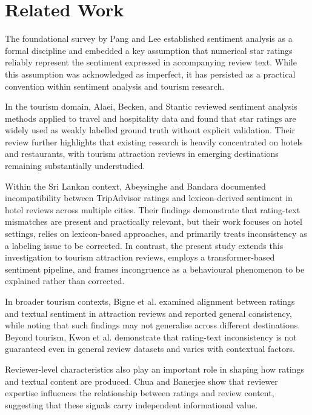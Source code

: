 \documentclass[conference]{IEEEtran}
\begin{document}
\section{Related Work}
The foundational survey by Pang and Lee \cite{pang2008opinion} established sentiment analysis as a formal discipline and embedded a key assumption that numerical star ratings reliably represent the sentiment expressed in accompanying review text. While this assumption was acknowledged as imperfect, it has persisted as a practical convention within sentiment analysis and tourism research.

In the tourism domain, Alaei, Becken, and Stantic \cite{alaei2019tourism} reviewed sentiment analysis methods applied to travel and hospitality data and found that star ratings are widely used as weakly labelled ground truth without explicit validation. Their review further highlights that existing research is heavily concentrated on hotels and restaurants, with tourism attraction reviews in emerging destinations remaining substantially understudied.

Within the Sri Lankan context, Abeysinghe and Bandara \cite{abeysinghe2022selflearning,abeysinghe2021anuradhapura} documented incompatibility between TripAdvisor ratings and lexicon-derived sentiment in hotel reviews across multiple cities. Their findings demonstrate that rating-text mismatches are present and practically relevant, but their work focuses on hotel settings, relies on lexicon-based approaches, and primarily treats inconsistency as a labeling issue to be corrected. In contrast, the present study extends this investigation to tourism attraction reviews, employs a transformer-based sentiment pipeline, and frames incongruence as a behavioural phenomenon to be explained rather than corrected.

In broader tourism contexts, Bigne et al. \cite{bigne2023aligned} examined alignment between ratings and textual sentiment in attraction reviews and reported general consistency, while noting that such findings may not generalise across different destinations. Beyond tourism, Kwon et al. \cite{kwon2025beyond} demonstrate that rating-text inconsistency is not guaranteed even in general review datasets and varies with contextual factors.

Reviewer-level characteristics also play an important role in shaping how ratings and textual content are produced. Chua and Banerjee \cite{chua2015helpfulness} show that reviewer expertise influences the relationship between ratings and review content, suggesting that these signals carry independent informational value.
\end{document}
